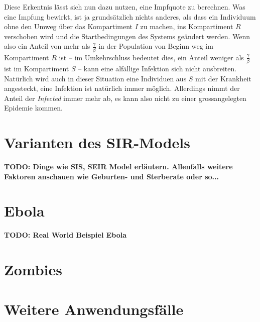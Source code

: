 \begin{refsection}
Diese Erkentnis lässt sich nun dazu nutzen, eine Impfquote zu berechnen. 
Was eine Impfung bewirkt, ist ja grundsätzlich nichts anderes, als dass ein Individuum ohne den Umweg über das Kompartiment $I$ zu machen, ins Kompartiment $R$ verschoben wird und die Startbedingungen des Systems geändert werden.
Wenn also ein Anteil von mehr als $\frac{\gamma}{\beta}$ in der Population von Beginn weg im Kompartiment $R$ ist -- im Umkehrschluss bedeutet dies, ein Anteil weniger als $\frac{\gamma}{\beta}$ ist im Kompartiment $S$ -- kann eine alfällige Infektion sich nicht ausbreiten.
Natürlich wird auch in dieser Situation eine Individuen aus $S$ mit der Krankheit angesteckt, eine Infektion ist natürlich immer möglich. 
Allerdings nimmt der Anteil der \emph{Infected} immer mehr ab, es kann also nicht zu einer grossangelegten Epidemie kommen.

\section{Varianten des SIR-Models}
\textbf{TODO: Dinge wie SIS, SEIR Model erläutern. Allenfalls weitere Faktoren anschauen wie Geburten- und Sterberate oder so...}

\section{Ebola}
\textbf{TODO: Real World Beispiel Ebola}

\section{Zombies}

\section{Weitere Anwendungsfälle}



\printbibliography[heading=subbibliography]
\end{refsection}

